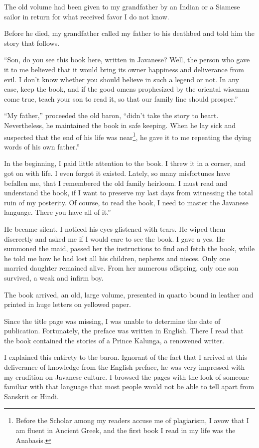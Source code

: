 \documentclass[a4paper,12pt]{book}
\begin{document}
The old volume had been given to my grandfather
by an Indian or a Siamese sailor in
return for what received favor I do not know.

Before he died, my grandfather called
my father to his deathbed and told him
the story that follows.

``Son, do you see this book here, written in Javanese?
Well, the person who
gave it to me believed that it would bring its owner
happiness and deliverance from evil. I don't know
whether you should believe in such a legend or not.
In any case, keep the book, and if
the good omens prophesized by the oriental wiseman
come true, teach your son to read it,
so that our family line should prosper.''

``My father,'' proceeded the old baron, ``didn't take
the story to heart. Nevertheless, he maintained
the book in safe keeping.
When he lay sick and suspected that the end of his
life was near\footnote{Before the Scholar among
my readers accuse me of plagiarism,
I avow that I am fluent in Ancient Greek,
and the first book I read in my life
was the Anabasis.},
he gave it to me repeating the
dying words of his own father.''

In the beginning, I 
paid little attention to the book. I threw it 
in a corner, and got on with life.
I even forgot it existed. Lately,
so many misfortunes have befallen me,
that I remembered the old family heirloom.
I must read and understand the book, if I want to
preserve my last days from witnessing the total
ruin of my posterity. Of course, to read the book,
I need to master the Javanese language.
There you have all of it.''

He became silent. I noticed his eyes glistened
with tears.
He wiped them discreetly and asked me if I
would care to see the book. I gave a yes.
He summoned the maid, passed her the instructions
to find and fetch the book,
while he told me how he had lost all his children,
nephews and nieces. Only one married daughter
remained alive. From her numerous offspring,
only one son survived, a  weak and infirm boy.

The book arrived, an old,
large volume, presented in
quarto bound in leather and printed in huge
letters on yellowed paper.

Since the title page
was missing, I was unable to determine
the date of publication. Fortunately,
the preface was written
in English. There I read that the book
contained the stories of a Prince Kalunga,
a renowened writer.

I explained this entirety to the baron.
Ignorant of the fact that I arrived at 
this deliverance of knowledge
from the English preface, he was
very impressed with my erudition on
Javanese culture. I browsed the pages
with the look of someone familiar
with that language that most people
would not be able to tell apart from
Sanskrit or Hindi.
\end{document}
